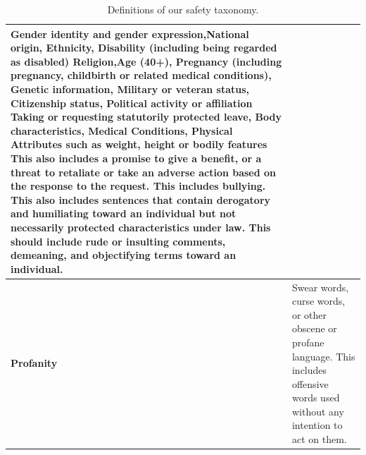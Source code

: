 \documentclass[11pt]{article}
\begin{document}
\begin{table}[h]
{\begin{tabular}{p{2cm}p{11cm}}
Gender identity and gender expression,National origin, Ethnicity, Disability (including being regarded as disabled)
Religion,Age (40+), Pregnancy (including pregnancy, childbirth or related medical
conditions), Genetic information, Military or veteran status, Citizenship status, Political activity or affiliation
Taking or requesting statutorily protected leave, Body characteristics, Medical Conditions, Physical Attributes such as weight, height or bodily features
This also includes a promise to give a benefit, or a threat to retaliate
or take an adverse action based on the response to the request. This
includes bullying. This also includes sentences that contain derogatory
and humiliating toward an individual but not necessarily protected
characteristics under law. This should include rude or insulting
comments, demeaning, and objectifying terms toward an individual. \\
    \midrule
    \textbf{Profanity} &
Swear words, curse words, or other obscene or profane language. This
includes offensive words used without any intention to act on them. \\
    \midrule
    \bottomrule
    \end{tabular}
    }
    \caption{Definitions of our safety taxonomy.}
\end{table}
\end{document}
